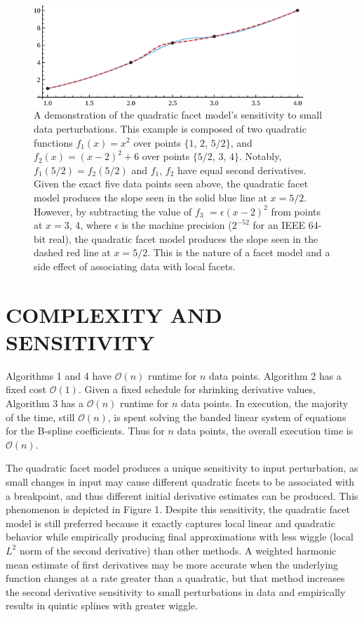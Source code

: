 \begin{figure}
\includegraphics[width=4in]{vis/1-sensitivity.eps}
\caption{ %
  A demonstration of the quadratic facet model's sensitivity to small
  data perturbations. This example is composed of two quadratic
  functions $f_1(x) = x^2$ over points $\{1$, $2$, $5/2\}$, and
  $f_2(x) = (x-2)^2 + 6$ over points $\{5/2$, $3$, $4\}$. Notably,
  $f_1(5/2) = f_2(5/2)$ and $f_1$, $f_2$ have equal second
  derivatives. Given the exact five data points seen above, the
  quadratic facet model produces the slope seen in the solid blue line
  at $x = 5/2$. However, by subtracting the value of $f_3$ $=
  \epsilon(x-2)^2$ from points at $x = 3$, 4, where $\epsilon$ is the
  machine precision ($2^{-52}$ for an IEEE 64-bit real), the quadratic
  facet model produces the slope seen in the dashed red line at $x =
  5/2$. This is the nature of a facet model and a side effect of
  associating data with local facets.}
\end{figure}


\section{COMPLEXITY AND SENSITIVITY}

Algorithms 1 and 4 have $\mathcal{O}(n)$ runtime for $n$ data
points. Algorithm 2 has a fixed cost $\mathcal{O}(1)$. Given a fixed
schedule for shrinking derivative values, Algorithm 3 has a
$\mathcal{O}(n)$ runtime for $n$ data points. In execution, the
majority of the time, still $\mathcal{O}(n)$, is spent solving the banded
linear system of equations for the B-spline coefficients. Thus for $n$
data points, the overall execution time is $\mathcal{O}(n)$.

The quadratic facet model produces a unique sensitivity to input
perturbation, as small changes in input may cause different quadratic
facets to be associated with a breakpoint, and thus different initial
derivative estimates can be produced. This phenomenon is depicted in
Figure 1. Despite this sensitivity, the quadratic facet model is still
preferred because it exactly captures local linear and quadratic
behavior while empirically producing final approximations with less
wiggle (local $L^2$ norm of the second derivative) than other methods. A
weighted harmonic mean estimate of first derivatives may be more
accurate when the underlying function changes at a rate greater than a
quadratic, but that method increases the second derivative sensitivity
to small perturbations in data and empirically results in quintic
splines with greater wiggle.

